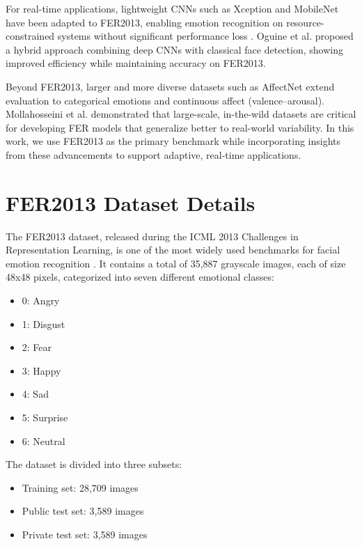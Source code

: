 \documentclass[conference]{IEEEtran}
\begin{document}
For real-time applications, lightweight CNNs such as Xception and MobileNet have been adapted to FER2013, enabling emotion recognition on resource-constrained systems without significant performance loss \cite{levi2015age}. Oguine et al. \cite{oguine2022hybrid} proposed a hybrid approach combining deep CNNs with classical face detection, showing improved efficiency while maintaining accuracy on FER2013.

Beyond FER2013, larger and more diverse datasets such as AffectNet extend evaluation to categorical emotions and continuous affect (valence–arousal). Mollahosseini et al. \cite{mollahosseini2017affectnet} demonstrated that large-scale, in-the-wild datasets are critical for developing FER models that generalize better to real-world variability. In this work, we use FER2013 as the primary benchmark while incorporating insights from these advancements to support adaptive, real-time applications.

\section{FER2013 Dataset Details}
The FER2013 dataset, released during the ICML 2013 Challenges in Representation Learning, is one of the most widely used benchmarks for facial emotion recognition \cite{goodfellow2013icml}. It contains a total of 35,887 grayscale images, each of size 48x48 pixels, categorized into seven different emotional classes:

\begin{itemize}
    \item 0: Angry
    \item 1: Disgust
    \item 2: Fear
    \item 3: Happy
    \item 4: Sad
    \item 5: Surprise
    \item 6: Neutral
\end{itemize}

The dataset is divided into three subsets:
\begin{itemize}
    \item Training set: 28,709 images
    \item Public test set: 3,589 images
    \item Private test set: 3,589 images
\end{itemize}
\end{document}
